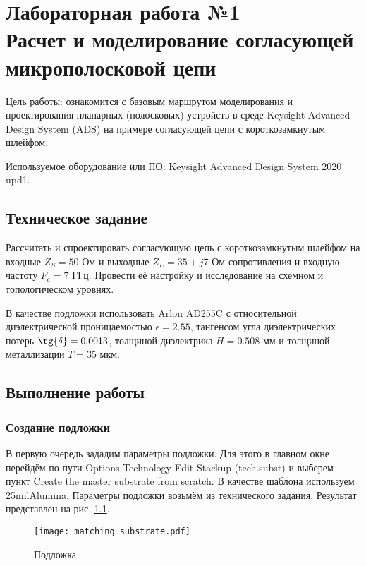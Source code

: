 \chapter{Лабораторная работа №1 \\
Расчет и моделирование согласующей микрополосковой цепи}

Цель работы: ознакомится с базовым маршрутом моделирования и проектирования планарных (полосковых) устройств в среде Keysight Advanced Design System (ADS) на примере согласующей цепи с короткозамкнутым шлейфом.

Используемое оборудование или ПО: Keysight Advanced Design System 2020 upd1.

\section{Техническое задание}

Рассчитать и спроектировать согласующую цепь с короткозамкнутым шлейфом на входные $Z_S = 50\text{~Ом}$ и выходные $Z_L = 35 + j 7 \text{~Ом}$ сопротивления и входную частоту $F_c = 7 \text{~ГГц}$.
Провести её настройку и исследование на схемном и топологическом уровнях.

В качестве подложки использовать Arlon AD255C с относительной диэлектрической проницаемостью $\epsilon = 2.55$, тангенсом угла диэлектрических потерь $\tg{\delta} = 0.0013$, толщиной диэлектрика $H = 0.508 \text{~мм}$ и толщиной металлизации $T = 35 \text{~мкм}$.

\section{Выполнение работы}

\subsection{Создание подложки}

В первую очередь зададим параметры подложки. Для этого в главном окне перейдём по пути Options \textrightarrow Technology \textrightarrow Edit Stackup (tech.subst) и выберем пункт Create the master substrate from scratch. В качестве шаблона используем 25milAlumina. Параметры подложки возьмём из технического задания. Результат представлен на рис. \ref{fig:matching_substrate}.

\begin{figure}
    \centering
    \texttt{[image: matching\_substrate.pdf]}
    \caption{Подложка}
    \label{fig:matching_substrate}
\end{figure}

